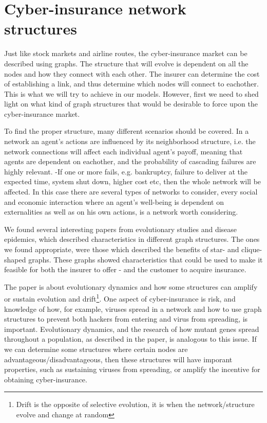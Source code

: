 \section{Cyber-insurance network structures}

Just like stock markets and airline routes, the cyber-insurance market can be described using graphs. The structure that will evolve is dependent on all the nodes and how they connect with each other. The insurer can determine the cost of establishing a link, and thus  determine which nodes will connect to eachother. This is what we will try to achieve in our models. However, first we need to shed light on what kind of graph structures that would be desirable to force upon the cyber-insurance market.

To find the proper structure, many different scenarios should be covered. In a network an agent's actions are influenced by its neighborhood structure, i.e. the network connections will affect each individual agent's payoff, meaning that agents are dependent on eachother, and the probability of cascading failures are highly relevant. -If one or more fails, e.g. bankruptcy, failure to deliver at the expected time, system shut down, higher cost etc, then the whole network will be affected. In this case there are several types of networks to consider, every social and economic interaction where an agent's well-being is dependent on externalities as well as on his own actions, is a network worth considering.

We found several interesting papers from evolutionary studies and disease epidemics, which described  characteristics in different graph structures. The ones we found appropriate, were those which described the benefits of star- and clique-shaped graphs. These graphs showed characteristics that could be used to make it feasible for both the insurer to offer - and the customer to acquire insurance. 

 The paper \cite{lieberman2005evolutionary} is about evolutionary dynamics and how some structures
can amplify or sustain evolution and drift\footnote{Drift is the opposite of selective evolution, it is when the network/structure evolve and change at random}. One aspect of cyber-insurance is risk, and knowledge of how, for example, viruses spread in a network and how to use graph structures to prevent both hackers from entering and virus from spreading, is important. Evolutionary dynamics, and the research of how mutant genes spread throughout a population, as described in the paper, is analogous to this issue.
If we can determine some structures where certain nodes are advantageous/disadvantageous, then these structures will have imporant  properties, such as sustaining viruses from spreading, or amplify the incentive for obtaining cyber-insurance. 

